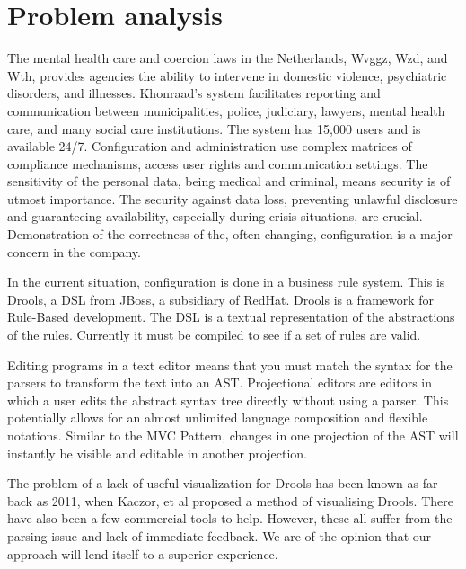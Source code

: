 \section{Problem analysis}

The mental health care and coercion laws in the Netherlands, Wvggz, Wzd, and Wth, provides agencies the ability to intervene in domestic violence, psychiatric disorders, and illnesses.
Khonraad's system facilitates reporting and communication between municipalities, police, judiciary, lawyers, mental health care, and many social care institutions.
The system has 15,000 users and is available 24/7. Configuration and administration use complex matrices of compliance mechanisms, access user rights and communication settings.
The sensitivity of the personal data, being medical and criminal, means security is of utmost importance.
The security against data loss, preventing unlawful disclosure and guaranteeing availability, especially during crisis situations, are crucial.
Demonstration of the correctness of the, often changing, configuration is a major concern in the company. 

In the current situation, configuration is done in a business rule system. This is Drools, a DSL from JBoss, a subsidiary of RedHat.
Drools is a framework for Rule-Based development.
The DSL is a textual representation of the abstractions of the rules.
Currently it must be compiled to see if a set of rules are valid.

Editing programs in a text editor means that you must match the syntax for the parsers to transform the text into an AST.
Projectional editors are editors in which a user edits the abstract syntax tree directly without using a parser\cite{voelter2014generic}.
This potentially allows for an almost unlimited language composition and flexible notations.
Similar to the MVC Pattern, changes in one projection of the AST will instantly be visible and editable in another projection\cite{guttormsen2017consistent}.

The problem of a lack of useful visualization for Drools has been known as far back as 2011, when Kaczor, et al\cite{kaczor2011visual} proposed a method of visualising Drools. 
There have also been a few commercial tools to help.
However, these all suffer from the parsing issue and lack of immediate feedback. 
We are of the opinion that our approach will lend itself to a superior experience.
